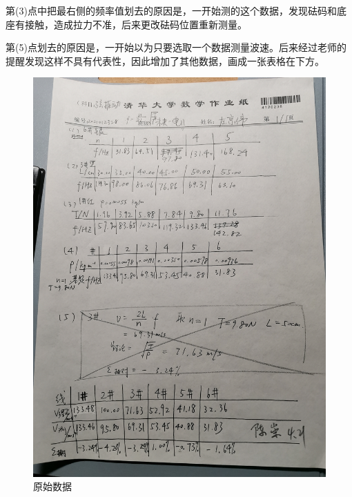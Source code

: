 \documentclass[a4paper,11pt]{article}
\begin{document}
    第(3)点中把最右侧的频率值划去的原因是，一开始测的这个数据，发现砝码和底座有接触，造成拉力不准，后来更改砝码位置重新测量。

    第(5)点划去的原因是，一开始以为只要选取一个数据测量波速。后来经过老师的提醒发现这样不具有代表性，因此增加了其他数据，画成一张表格在下方。

    \begin{figure}[ht]
        \centering
        \includegraphics[scale=0.6]{原始数据.png}
        \caption{原始数据}
        \label{fig:label}
    \end{figure}
\end{document}
